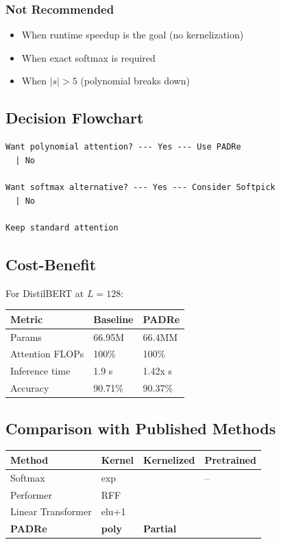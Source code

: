 \subsubsection{Not Recommended}
\begin{itemize}
\item When runtime speedup is the goal (no kernelization)
\item When exact softmax is required
\item When $|s| > 5$ (polynomial breaks down)

\end{itemize}
\subsection{Decision Flowchart}

\begin{lstlisting}
Want polynomial attention? --- Yes --- Use PADRe
  | No
   
Want softmax alternative? --- Yes --- Consider Softpick
  | No
   
Keep standard attention
\end{lstlisting}

\subsection{Cost-Benefit}

For DistilBERT at $L = 128$:

\begin{table}[H]
\centering
\small
\begin{tabular}{lll}
\toprule
\textbf{Metric} & \textbf{Baseline} & \textbf{PADRe} \\
\midrule
Params & 66.95M & 66.4MM \\
Attention FLOPs & 100\% & 100\% \\
Inference time & 1.9 s & 1.42x s \\
Accuracy & 90.71\% & 90.37\% \\
\bottomrule
\end{tabular}
\end{table}

\subsection{Comparison with Published Methods}

\begin{table}[H]
\centering
\small
\begin{tabular}{llll}
\toprule
\textbf{Method} & \textbf{Kernel} & \textbf{Kernelized} & \textbf{Pretrained} \\
\midrule
Softmax & exp &  & -- \\
Performer & RFF &  &  \\
Linear Transformer & elu+1 &  &  \\
\textbf{PADRe} & \textbf{poly} & \textbf{Partial} & \textbf{ } \\
\bottomrule
\end{tabular}
\end{table}

